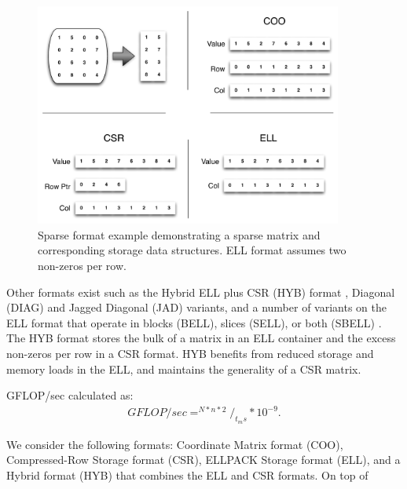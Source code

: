 \documentclass{report}
\begin{document}
\begin{figure}
\centering
\includegraphics[width=0.9\textwidth]{gpu_content/omnigraffle/SparseStorage.pdf}
\caption{Sparse format example demonstrating a sparse matrix and corresponding storage data structures. ELL format assumes two non-zeros per row. }
\label{fig:sparse_format}
\end{figure}

Other formats exist such as the Hybrid ELL plus CSR (HYB) format \cite{Bell2009}, Diagonal (DIAG) and Jagged Diagonal (JAD) variants, and a number of variants on the ELL format that operate in blocks (BELL), slices (SELL), or both (SBELL) \cite{SuKeutzer2012}. The HYB format stores the bulk of a matrix in an ELL container and the excess non-zeros per row in a CSR format. HYB benefits from reduced storage and memory loads in the ELL, and maintains the generality of a CSR matrix. 


GFLOP/sec calculated as: 
\begin{align}
GFLOP/sec = ^{N * n * 2} /_{t_ms} * 10^{-9}. 
\end{align}


We consider the following formats: Coordinate Matrix format (COO), Compressed-Row Storage format (CSR), ELLPACK Storage format (ELL), and a Hybrid format (HYB) that combines the ELL and CSR formats. On top of 
\end{document}
